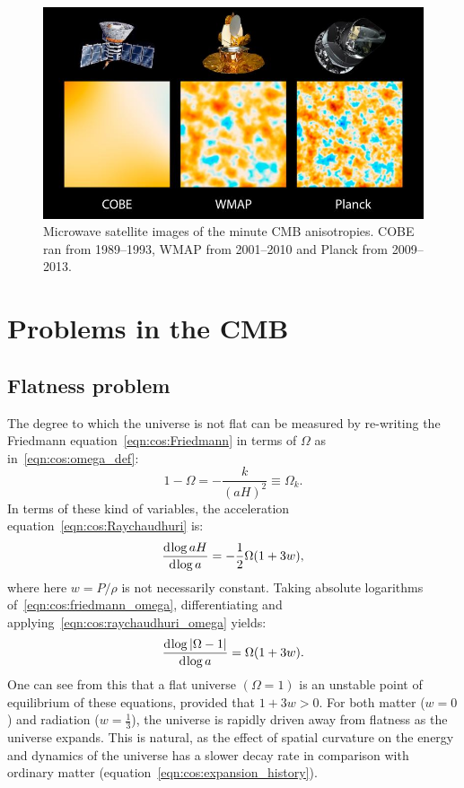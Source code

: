 \begin{figure}[tp]
  \centering
  \includegraphics[width=\textwidth]{chapters/inflationary_cosmology/figures/satellites}
  \caption{Microwave satellite images of the minute CMB anisotropies. COBE ran from 1989--1993, WMAP from 2001--2010 and Planck from 2009--2013.}\label{fig:cos:satellites}
\end{figure}

\section{Problems in the CMB}
\subsection{Flatness problem}
The degree to which the universe is not flat can be measured by re-writing the Friedmann equation~\eqref{eqn:cos:Friedmann} in terms of \(\Omega\) as in~\eqref{eqn:cos:omega_def}:
\begin{equation}
  1-\Omega = -\frac{k}{{(aH)}^2} \equiv \Omega_k.
  \label{eqn:cos:friedmann_omega}
\end{equation}
In terms of these kind of variables, the acceleration equation~\eqref{eqn:cos:Raychaudhuri} is:
\begin{equation}
  \frac{\operatorname{d}^{}\!{\log aH}}{\operatorname{d}^{}\!{\log a} } = -\frac{1}{2}\Omega(1+3w),
  \label{eqn:cos:raychaudhuri_omega}
\end{equation}
where here \(w=P/\rho\) is not necessarily constant.
Taking absolute logarithms of~\eqref{eqn:cos:friedmann_omega}, differentiating and applying~\eqref{eqn:cos:raychaudhuri_omega} yields:
\begin{equation}
  \frac{\operatorname{d}^{}\!{\log |\Omega-1|}}{\operatorname{d}^{}\!{\log a} } = \Omega(1+3w).
  \label{eqn:cos:instability}
\end{equation}
One can see from this that a flat universe \((\Omega=1)\) is an unstable point of equilibrium of these equations, provided that \(1+3w>0\). For both matter (\({w=0}\)) and radiation (\({w=\frac{1}{3}}\)), the universe is rapidly driven away from flatness as the universe expands. This is natural, as the effect of spatial curvature on the energy and dynamics of the universe has a slower decay rate in comparison with ordinary matter (equation~\ref{eqn:cos:expansion_history}).

